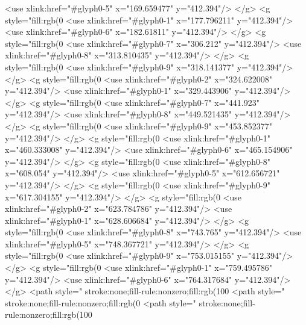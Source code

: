   <use xlink:href="#glyph0-5" x="169.659477" y="412.394"/>
</g>
<g style="fill:rgb(0%
  <use xlink:href="#glyph0-1" x="177.796211" y="412.394"/>
  <use xlink:href="#glyph0-6" x="182.61811" y="412.394"/>
</g>
<g style="fill:rgb(0%
  <use xlink:href="#glyph0-7" x="306.212" y="412.394"/>
  <use xlink:href="#glyph0-8" x="313.810435" y="412.394"/>
</g>
<g style="fill:rgb(0%
  <use xlink:href="#glyph0-9" x="318.141377" y="412.394"/>
</g>
<g style="fill:rgb(0%
  <use xlink:href="#glyph0-2" x="324.622008" y="412.394"/>
  <use xlink:href="#glyph0-1" x="329.443906" y="412.394"/>
</g>
<g style="fill:rgb(0%
  <use xlink:href="#glyph0-7" x="441.923" y="412.394"/>
  <use xlink:href="#glyph0-8" x="449.521435" y="412.394"/>
</g>
<g style="fill:rgb(0%
  <use xlink:href="#glyph0-9" x="453.852377" y="412.394"/>
</g>
<g style="fill:rgb(0%
  <use xlink:href="#glyph0-1" x="460.333008" y="412.394"/>
  <use xlink:href="#glyph0-6" x="465.154906" y="412.394"/>
</g>
<g style="fill:rgb(0%
  <use xlink:href="#glyph0-8" x="608.054" y="412.394"/>
  <use xlink:href="#glyph0-5" x="612.656721" y="412.394"/>
</g>
<g style="fill:rgb(0%
  <use xlink:href="#glyph0-9" x="617.304155" y="412.394"/>
</g>
<g style="fill:rgb(0%
  <use xlink:href="#glyph0-2" x="623.784786" y="412.394"/>
  <use xlink:href="#glyph0-1" x="628.606684" y="412.394"/>
</g>
<g style="fill:rgb(0%
  <use xlink:href="#glyph0-8" x="743.765" y="412.394"/>
  <use xlink:href="#glyph0-5" x="748.367721" y="412.394"/>
</g>
<g style="fill:rgb(0%
  <use xlink:href="#glyph0-9" x="753.015155" y="412.394"/>
</g>
<g style="fill:rgb(0%
  <use xlink:href="#glyph0-1" x="759.495786" y="412.394"/>
  <use xlink:href="#glyph0-6" x="764.317684" y="412.394"/>
</g>
<path style=" stroke:none;fill-rule:nonzero;fill:rgb(100%
<path style=" stroke:none;fill-rule:nonzero;fill:rgb(0%
<path style=" stroke:none;fill-rule:nonzero;fill:rgb(100%
